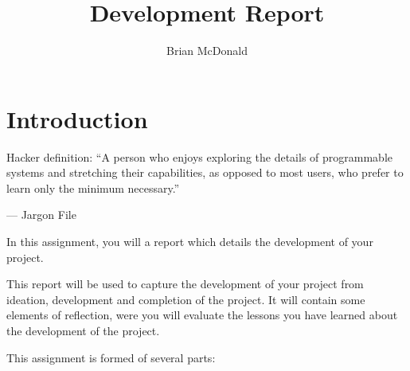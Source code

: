 \documentclass{../../fal_assignment}
\title{Development Report}
\author{Brian McDonald}
\begin{document}
\maketitle

\section*{Introduction}

\begin{marginquote}
Hacker definition: ``A person who enjoys exploring the details of programmable systems and stretching their capabilities, as opposed to most users, who prefer to learn only the minimum necessary.''

--- Jargon File

\end{marginquote}

In this assignment, you will a report which details the development of your project. 

This report will be used to capture the development of your project from ideation, development and completion of the project. It will contain some elements of reflection, were you will evaluate the lessons you have learned about the development of the project.

This assignment is formed of several parts:
\end{document}
